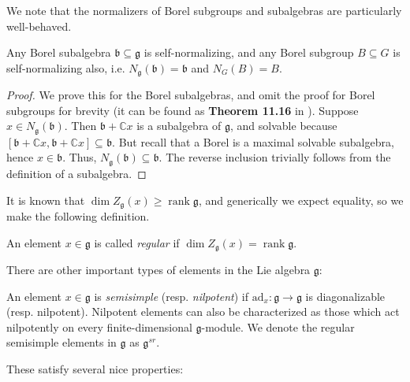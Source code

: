 \documentclass[11pt]{article}
\newcommand{\C}{\mathbb{C}}
\newcommand{\rk}{\operatorname{rank}}
\theoremstyle{definition}
\numberwithin{equation}{section} %
\begin{document}
\noindent We note that the normalizers of Borel subgroups and subalgebras are particularly well-behaved. 
\begin{proposition}
    Any Borel subalgebra $\mathfrak{b}\subseteq \mathfrak{g}$ is self-normalizing, and any Borel subgroup $B\subseteq G$ is self-normalizing also, i.e. $N_\mathfrak{g}(\mathfrak{b}) = \mathfrak{b}$ and $N_G(B) = B$. 
\end{proposition}

\begin{proof}
    We prove this for the Borel subalgebras, and omit the proof for Borel subgroups for brevity (it can be found as \textbf{Theorem 11.16} in \cite{Borel1991LinearAlgebraicGroups}). Suppose $x\in N_\mathfrak{g}(\mathfrak{b})$. Then $\mathfrak{b} + \C x$ is a subalgebra of $\mathfrak{g}$, and solvable because $[\mathfrak{b}+\C x, \mathfrak{b} + \C x]\subseteq \mathfrak{b}$. But recall that a Borel is a maximal solvable subalgebra, hence $x\in \mathfrak{b}$. Thus, $N_\mathfrak{g}(\mathfrak{b}) \subseteq \mathfrak{b}$. The reverse inclusion trivially follows from the definition of a subalgebra.
\end{proof}

\noindent It is known that $\dim Z_\mathfrak{g}(x)\geq \rk \mathfrak{g}$, and generically we expect equality, so we make the following definition. 

\begin{definition}
    An element $x\in \mathfrak{g}$ is called \emph{regular} if $\dim Z_\mathfrak{g}(x)= \rk \mathfrak{g}$. 
\end{definition}

\noindent There are other important types of elements in the Lie algebra $\mathfrak{g}$:

\begin{definition}
    An element $x\in \mathfrak{g}$ is \emph{semisimple} (resp. \emph{nilpotent}) if $\mathrm{ad}_x:\mathfrak{g}\to \mathfrak{g}$ is diagonalizable (resp. nilpotent). Nilpotent elements can also be characterized as those which act nilpotently on every finite-dimensional $\mathfrak{g}$-module. We denote the regular semisimple elements in $\mathfrak{g}$ as $\mathfrak{g}^{sr}$. 
\end{definition}

\noindent These satisfy several nice properties:
\end{document}
